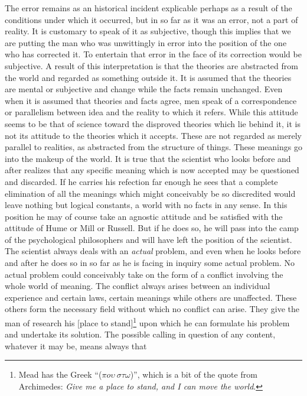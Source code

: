 \documentclass[12pt]{article}
\begin{document}
The error remains as an historical incident explicable
perhaps as a result of the conditions under which it
occurred, but in so far as it was an error, not a part
of reality. It is customary to speak of it as subjective,
though this implies that we are putting the man who
was unwittingly in error into the position of the one
who has corrected it. To entertain that error in the
face of its correction would be subjective. A result
of this interpretation is that the theories are abstracted
from the world and regarded as something outside it.
It is assumed that the theories are mental or subjective
and change while the facts remain unchanged. Even
when it is assumed that theories and facts agree, men
speak of a correspondence or parallelism between idea
and the reality to which it refers. While this attitude
seems to be that of science toward the disproved theories
which lie behind it, it is not its attitude to the
theories which it accepts. These are not regarded as
merely parallel to realities, as abstracted from the
structure of things. These meanings go into the makeup
of the world. It is true that the scientist who looks
before and after realizes that any specific meaning
which is now accepted may be questioned and discarded.
If he carries his refection far enough he sees that a complete
elimination of all the meanings which might conceivably
be so discredited would leave nothing but logical
constants, a world with no facts in any sense. In this
position he may of course take an agnostic attitude
and be satisfied with the attitude of Hume or Mill or
Russell. But if he does so, he will pass into the camp
of the psychological philosophers and will have left
the position of the scientist. The scientist always deals
with an \emph{actual} problem, and even when he looks before
and after he does so in so far as he is facing in inquiry
some actual problem. No actual problem could
conceivably take on the form of a conflict involving
the whole world of meaning. The conflict always arises
between an individual experience and certain laws, certain
meanings while others are unaffected. These others
form the necessary field without which no conflict can
arise. They give the man of research his [place to stand]\footnote{Mead has the Greek ``(${\pi}o{\upsilon}~{\sigma}{\tau}{\omega}$)'', which is a bit of the quote from Archimedes: \emph{Give me a place to stand, and I can move the world}.}
upon which he can formulate his problem and undertake
its solution. The possible calling in question of
any content, whatever it may be, means always that
\end{document}
